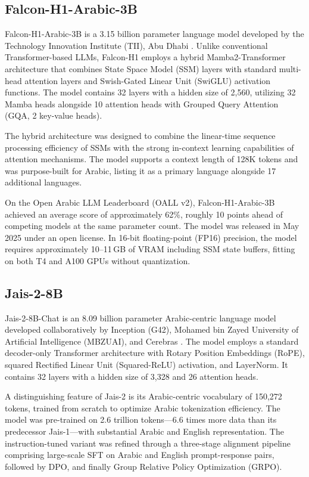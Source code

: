 \subsection{Falcon-H1-Arabic-3B}
\label{sec:falcon_h1}

Falcon-H1-Arabic-3B is a 3.15 billion parameter language model developed by the Technology Innovation Institute (TII), Abu Dhabi \cite{falcon_h1_2025}. Unlike conventional Transformer-based LLMs, Falcon-H1 employs a hybrid Mamba2-Transformer architecture that combines State Space Model (SSM) layers \cite{gu_2024_mamba} with standard multi-head attention layers and Swish-Gated Linear Unit (SwiGLU) activation functions. The model contains 32 layers with a hidden size of 2,560, utilizing 32 Mamba heads alongside 10 attention heads with Grouped Query Attention (GQA, 2 key-value heads).

The hybrid architecture was designed to combine the linear-time sequence processing efficiency of SSMs with the strong in-context learning capabilities of attention mechanisms. The model supports a context length of 128K tokens and was purpose-built for Arabic, listing it as a primary language alongside 17 additional languages.

On the Open Arabic LLM Leaderboard (OALL v2), Falcon-H1-Arabic-3B achieved an average score of approximately 62\%, roughly 10 points ahead of competing models at the same parameter count. The model was released in May 2025 under an open license. In 16-bit floating-point (FP16) precision, the model requires approximately 10--11\,GB of VRAM including SSM state buffers, fitting on both T4 and A100 GPUs without quantization.

\subsection{Jais-2-8B}
\label{sec:jais2}

Jais-2-8B-Chat is an 8.09 billion parameter Arabic-centric language model developed collaboratively by Inception (G42), Mohamed bin Zayed University of Artificial Intelligence (MBZUAI), and Cerebras \cite{sengupta_2023_jais}. The model employs a standard decoder-only Transformer architecture with Rotary Position Embeddings (RoPE), squared Rectified Linear Unit (Squared-ReLU) activation, and LayerNorm. It contains 32 layers with a hidden size of 3,328 and 26 attention heads.

A distinguishing feature of Jais-2 is its Arabic-centric vocabulary of 150,272 tokens, trained from scratch to optimize Arabic tokenization efficiency. The model was pre-trained on 2.6 trillion tokens---6.6 times more data than its predecessor Jais-1---with substantial Arabic and English representation. The instruction-tuned variant was refined through a three-stage alignment pipeline comprising large-scale SFT on Arabic and English prompt-response pairs, followed by DPO, and finally Group Relative Policy Optimization (GRPO).

